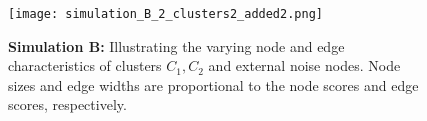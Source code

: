 	\begin{figure}[!hbt]
				\centering
				\texttt{[image: simulation\_B\_2\_clusters2\_added2.png]}		
				\caption{{\bf Simulation B:} Illustrating the varying node and edge characteristics of clusters $C_1, C_2$ and external noise nodes. Node sizes and edge widths are proportional to the node scores and edge scores, respectively.}
				\label{figsimB}
			\end{figure} 
